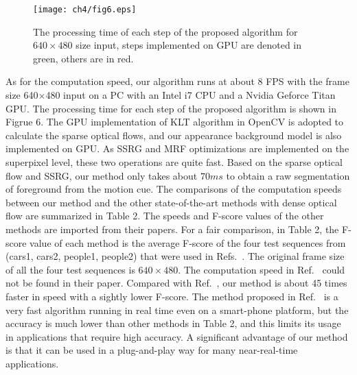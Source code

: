 \begin{figure}[!htbp]
\begin{center}
  \texttt{[image: ch4/fig6.eps]}

\end{center}

\caption{The processing time of each step of the proposed algorithm for $640\times480$ size input, steps implemented on GPU are denoted in green, others are in red.}
\label{fig:5}       %
\end{figure}
As for the computation speed, our algorithm runs at about 8 FPS with the frame size 640$\times$480 input on a PC with an Intel i7 CPU and a Nvidia Geforce Titan GPU. The processing time for each step of the proposed algorithm is shown in Figrue 6. The GPU implementation of KLT algorithm in OpenCV is adopted to calculate the sparse optical flows, and our appearance background model is also implemented on GPU. As SSRG and MRF optimizations are implemented on the superpixel level,  these two operations are quite fast. Based on the sparse optical flow and SSRG, our method only takes about $70ms$ to obtain a raw segmentation of foreground from the motion cue. The comparisons of the computation speeds between our method and the other state-of-the-art methods with dense optical flow are summarized in Table 2. The speeds and F-score values of the other methods are imported from their papers. For a fair comparison, in Table 2, the F-score value of each method is the average F-score of the four test sequences from \cite{HopKinsDataSet}(cars1, cars2, people1, people2) that were used in Refs.~. The original frame size of all the four test sequences is $640\times480$. The computation speed in Ref.~ could not be found in their paper. Compared with Ref.~, our method is about 45 times faster in speed with a sightly lower F-score. The method proposed in Ref.~ is a very fast algorithm running in real time even on a smart-phone platform, but the accuracy is much lower than other methods in Table 2, and this limits its usage in applications that require high accuracy. A significant advantage of our method is that it can be used in a plug-and-play way for many near-real-time applications.
